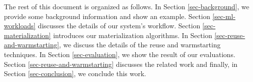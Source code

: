 The rest of this document is organized as follows.
In Section \ref{sec-background}, we provide some background information and show an example.
Section \ref{sec-ml-workloads} discusses the details of our system's workflow.
Section \ref{sec-materialization} introduces our materialization algorithms.
In Section \ref{sec-reuse-and-warmstarting}, we discuss the details of the reuse and warmstarting techniques.
In Section \ref{sec-evaluation}, we show the result of our evaluations.
Section \ref{sec-reuse-and-warmstarting} discusses the related work and finally, in Section \ref{sec-conclusion}, we conclude this work.